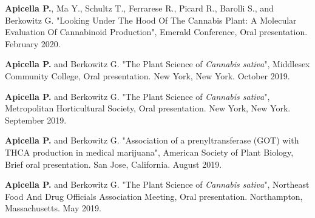 \documentclass[11pt,a4paper,]{awesome-cv}
\begin{document}
\leavevmode{}%
\textbf{Apicella P.}, Ma Y., Schultz T., Ferrarese R., Picard R., 
Barolli S., and Berkowitz G. "Looking Under The Hood Of The Cannabis Plant: 
A Molecular Evaluation Of Cannabinoid Production", Emerald Conference,
Oral presentation. February 2020.

\leavevmode{}%
\textbf{Apicella P.} and Berkowitz G. "The Plant Science of \emph{Cannabis sativa}", 
Middlesex Community College, Oral presentation. New York, New York. October 2019.

\leavevmode{}%
\textbf{Apicella P.} and Berkowitz G. "The Plant Science of \emph{Cannabis sativa}", Metropolitan 
Horticultural Society, Oral presentation. New York, New York. September 2019.

\leavevmode{}%
\textbf{Apicella P.} and Berkowitz G. "Association of a prenyltransferase (GOT) with THCA 
production in medical marijuana", American Society of Plant Biology, 
Brief oral presentation. San Jose, California. August 2019.

\leavevmode{}%
\textbf{Apicella P.} and Berkowitz G. "The Plant Science of \emph{Cannabis sativa}", 
Northeast Food And Drug Officials Association Meeting, Oral presentation. 
Northampton, Massachusetts. May 2019.

\pagebreak
\end{document}
